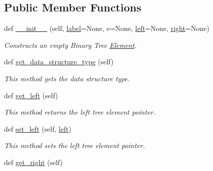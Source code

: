 \subsection*{Public Member Functions}
\begin{DoxyCompactItemize}
\item 
def \mbox{\hyperlink{class_bridges_1_1_bin_tree_element_1_1_bin_tree_element_a84d42e67dfa4b7fbae53ae797a10c13e}{\+\_\+\+\_\+init\+\_\+\+\_\+}} (self, \mbox{\hyperlink{class_bridges_1_1_element_1_1_element_a301fe5be8cf72b2c62f6a218feeb9166}{label}}=None, e=None, \mbox{\hyperlink{class_bridges_1_1_bin_tree_element_1_1_bin_tree_element_ae2011efda691620e8c76e366131b0195}{left}}=None, \mbox{\hyperlink{class_bridges_1_1_bin_tree_element_1_1_bin_tree_element_a5130987f56eff4edcc8c8ef323f8cd3d}{right}}=None)
\begin{DoxyCompactList}\small\item\em Constructs an empty Binary Tree \mbox{\hyperlink{namespace_bridges_1_1_element}{Element}}. \end{DoxyCompactList}\item 
def \mbox{\hyperlink{class_bridges_1_1_bin_tree_element_1_1_bin_tree_element_a141edccea36285810ded005aedd1ae41}{get\+\_\+data\+\_\+structure\+\_\+type}} (self)
\begin{DoxyCompactList}\small\item\em This method gets the data structure type. \end{DoxyCompactList}\item 
def \mbox{\hyperlink{class_bridges_1_1_bin_tree_element_1_1_bin_tree_element_afb02902f3dcf40e561f3d477c088cfbd}{get\+\_\+left}} (self)
\begin{DoxyCompactList}\small\item\em This method returns the left tree element pointer. \end{DoxyCompactList}\item 
def \mbox{\hyperlink{class_bridges_1_1_bin_tree_element_1_1_bin_tree_element_aa3d0afa18e6b058b4b1d8625ca6eca9a}{set\+\_\+left}} (self, \mbox{\hyperlink{class_bridges_1_1_bin_tree_element_1_1_bin_tree_element_ae2011efda691620e8c76e366131b0195}{left}})
\begin{DoxyCompactList}\small\item\em This method sets the left tree element pointer. \end{DoxyCompactList}\item 
def \mbox{\hyperlink{class_bridges_1_1_bin_tree_element_1_1_bin_tree_element_a3c013517d9600682363a4a8ee88dfc80}{get\+\_\+right}} (self)

\end{DoxyCompactItemize}
